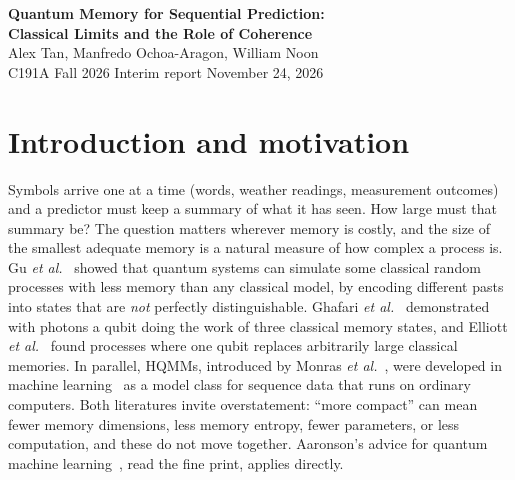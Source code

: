 \documentclass[11pt]{article}
\begin{document}
\begin{center}
{\Large\bfseries Quantum Memory for Sequential Prediction:\\[2pt] Classical Limits and the Role of Coherence}\\[6pt]
Alex Tan, Manfredo Ochoa-Aragon, William Noon\\[2pt]
{\small C191A Fall 2026 \textbullet{} Interim report \textbullet{} November 24, 2026}
\end{center}

\begin{abstract}
\noindent To predict a sequence, a model must carry a memory of the past. Hidden Markov models (HMMs) carry a probability distribution; hidden quantum Markov models (HQMMs) carry a quantum state updated by measurements. We ask what quantum coherence in that memory changes, and which comparisons justify calling a quantum model ``more compact.'' So far we have (i)~written HMMs as quantum operations and shown that coherence changes nothing unless the dynamics read it; (ii)~built a one-qubit, four-symbol model that every classical HMM needs at least four states to reproduce, with a lower bound checkable by hand; and (iii)~confirmed that classical HMMs fitted to its data match it at exactly that size. The separation concerns the dimension of a physical memory, not speed, accuracy or parameter count.
\end{abstract}

\section{Introduction and motivation}

Symbols arrive one at a time (words, weather readings, measurement outcomes) and a predictor must keep a summary of what it has seen. How large must that summary be? The question matters wherever memory is costly, and the size of the smallest adequate memory is a natural measure of how complex a process is. Gu \emph{et al.}~\cite{gu2012} showed that quantum systems can simulate some classical random processes with less memory than any classical model, by encoding different pasts into states that are \emph{not} perfectly distinguishable. Ghafari \emph{et al.}~\cite{ghafari2019} demonstrated with photons a qubit doing the work of three classical memory states, and Elliott \emph{et al.}~\cite{elliott2020} found processes where one qubit replaces arbitrarily large classical memories. In parallel, HQMMs, introduced by Monras \emph{et al.}~\cite{monras2010}, were developed in machine learning~\cite{srinivasan2018,adhikary2020} as a model class for sequence data that runs on ordinary computers. Both literatures invite overstatement: ``more compact'' can mean fewer memory dimensions, less memory entropy, fewer parameters, or less computation, and these do not move together. Aaronson's advice for quantum machine learning~\cite{aaronson2015}, read the fine print, applies directly.
\end{document}
